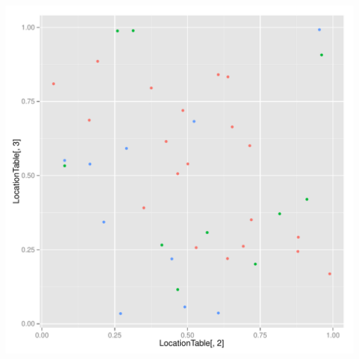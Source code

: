 \documentclass{article}\usepackage[]{graphicx}\usepackage[]{color}
\makeatletter
\def\maxwidth{ %
  \ifdim\Gin@nat@width>\linewidth
    \linewidth
  \else
    \Gin@nat@width
  \fi
}
\newenvironment{kframe}{%
 \def\at@end@of@kframe{}%
 \ifinner\ifhmode%
  \def\at@end@of@kframe{\end{minipage}}%
  \begin{minipage}{\columnwidth}%
 \fi\fi%
 \def\FrameCommand##1{\hskip\@totalleftmargin \hskip-\fboxsep
 \colorbox{shadecolor}{##1}\hskip-\fboxsep
     \hskip-\linewidth \hskip-\@totalleftmargin \hskip\columnwidth}%
 \MakeFramed {\advance\hsize-\width
   \@totalleftmargin\z@ \linewidth\hsize
   \@setminipage}}%
 {\par\unskip\endMakeFramed%
 \at@end@of@kframe}
\newenvironment{knitrout}{}{} %
\makeatother
\begin{document}
\begin{knitrout}
\begin{kframe}
\end{kframe}
\includegraphics[width=\maxwidth]{figure/unnamed-chunk-2-1} 

\end{knitrout}
\end{document}
